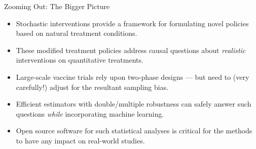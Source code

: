 \documentclass{beamer}
\begin{document}

\begin{frame}[c]{Zooming Out: The Bigger Picture}

\begin{center}
\begin{itemize}
  \itemsep8pt
  \item Stochastic interventions provide a framework for formulating novel
    policies based on natural treatment conditions.
  \item These modified treatment policies address causal questions about
    \textit{realistic} interventions on quantitative treatments.
  \item Large-scale vaccine trials rely upon two-phase designs --- but need to
    (very carefully!) adjust for the resultant sampling bias.
  \item Efficient estimators with double/multiple robustness can safely answer
    such questions \textit{while} incorporating machine learning.
  \item Open source software for such statistical analyses is critical for the
    methods to have any impact on real-world studies.
\end{itemize}
\end{center}

\note{
}

\end{frame}








\end{document}
